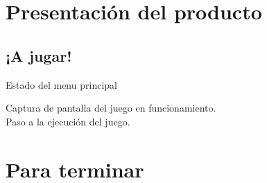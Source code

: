 \documentclass[9pt,xcolor=svgnames]{beamer}
\begin{document}
 \section{Presentación del producto}

  \subsection{¡A jugar!}
 \begin{frame}{Estado del menu principal}
   \transdissolve

  Captura de pantalla del juego en funcionamiento.\\

  Paso a la ejecución del juego.
 \end{frame}
 

  
 \section{Para terminar}

  

  
\end{document}

